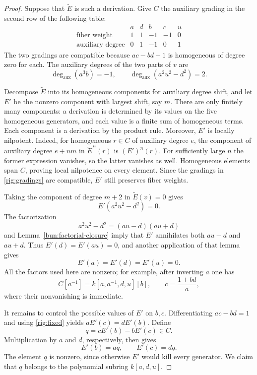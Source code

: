 \begin{proof}
Suppose that $\widetilde E$ is such a derivation.  Give $C$ the auxiliary
grading in the second row of the following table:
\begin{equation}\label{rig:gradings}
\begin{array}{c|rrrrr}
 &a&d&b&c&u\\ \hline
 \text{fiber weight}&1&1&-1&-1&0\\
 \text{auxiliary degree}&0&1&-1&0&1
\end{array}
\end{equation}
The two gradings are compatible because $ac-bd-1$ is homogeneous of degree
zero for each.  The auxiliary degrees of the two parts of $v$ are
\[
 \deg_{\mathrm{aux}}(a^3b)=-1,\qquad
 \deg_{\mathrm{aux}}(a^2u^2-d^2)=2.
\]

Decompose $\widetilde E$ into its homogeneous components for auxiliary
degree shift, and let $E'$ be the nonzero component with largest shift,
say $m$.  There are only finitely many components: a derivation is
determined by its values on the five homogeneous generators, and each
value is a finite sum of homogeneous terms.  Each component is a
derivation by the product rule.  Moreover, $E'$ is locally nilpotent.
Indeed, for homogeneous $r\in C$ of auxiliary degree $e$, the component
of auxiliary degree $e+nm$ in $\widetilde E^{\,n}(r)$ is $(E')^n(r)$.
For sufficiently large $n$ the former expression vanishes, so the latter
vanishes as well.  Homogeneous elements span $C$, proving local
nilpotence on every element.  Since the gradings in
\eqref{rig:gradings} are compatible, $E'$ still preserves fiber weights.

Taking the component of degree $m+2$ in $\widetilde E(v)=0$ gives
\[
 E'(a^2u^2-d^2)=0.
\]
The factorization
\[
 a^2u^2-d^2=(au-d)(au+d)
\]
and Lemma~\ref{bun:factorial-closure} imply that $E'$ annihilates both
$au-d$ and $au+d$.  Thus $E'(d)=E'(au)=0$, and another application of that
lemma gives
\begin{equation}\label{rig:fixed}
 E'(a)=E'(d)=E'(u)=0.
\end{equation}
All the factors used here are nonzero; for example, after inverting $a$
one has
\begin{equation}\label{rig:a-chart}
 C[a^{-1}]=k[a,a^{-1},d,u][b],\qquad c=\frac{1+bd}{a},
\end{equation}
where their nonvanishing is immediate.

It remains to control the possible values of $E'$ on $b,c$.
Differentiating $ac-bd=1$ and using \eqref{rig:fixed} yields
$aE'(c)=dE'(b)$.  Define
\[
 q=cE'(b)-bE'(c)\in C.
\]
Multiplication by $a$ and $d$, respectively, then gives
\begin{equation}\label{rig:q}
 E'(b)=aq,\qquad E'(c)=dq.
\end{equation}
The element $q$ is nonzero, since otherwise $E'$ would kill every generator.
We claim that $q$ belongs to the polynomial subring $k[a,d,u]$.


\end{proof}

